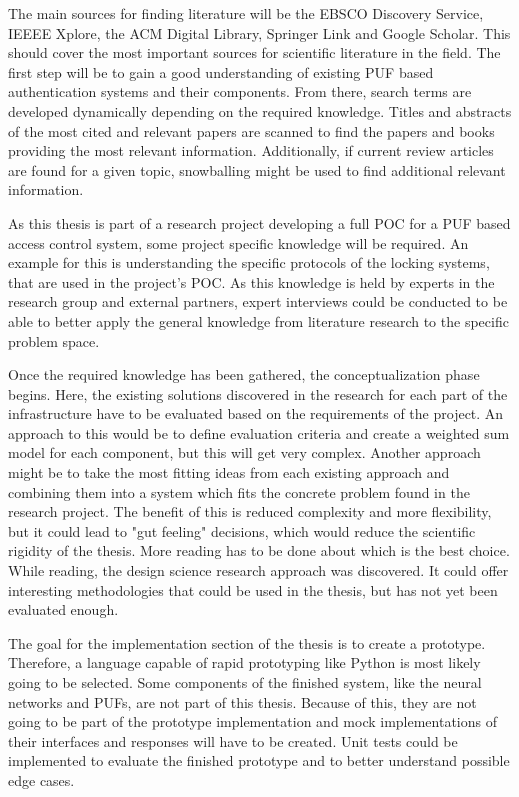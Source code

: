 The main sources for finding literature will be the EBSCO Discovery Service, IEEEE Xplore,
the ACM Digital Library, Springer Link and Google Scholar.
This should cover the most important sources for scientific literature in the field.
The first step will be to gain a good understanding of existing \ac{PUF} based authentication
systems and their components.
From there, search terms are developed dynamically depending on the required knowledge.
Titles and abstracts of the most cited and relevant papers are scanned to find the papers
and books providing the most relevant information.
Additionally, if current review articles are found for a given topic,
snowballing might be used to find additional relevant information.

As this thesis is part of a research project developing a full \ac{POC} for a \ac{PUF} based
access control system, some project specific knowledge will be required.
An example for this is understanding the specific protocols of the locking systems, that are used
in the project's \ac{POC}.
As this knowledge is held by experts in the research group and external partners,
expert interviews could be conducted to be able to better apply the general knowledge from
literature research to the specific problem space. 

Once the required knowledge has been gathered, the conceptualization phase begins.
Here, the existing solutions discovered in the research for each part of
the infrastructure have to be evaluated based on the requirements of the project.
An approach to this would be to define evaluation criteria and create a weighted sum model
for each component, but this will get very complex.
Another approach might be to take the most fitting ideas from each existing approach and
combining them into a system which fits the concrete problem found in the research project.
The benefit of this is reduced complexity and more flexibility, but it could lead to
"gut feeling" decisions, which would reduce the scientific rigidity of the thesis. More reading has to be done
about which is the best choice.
While reading, the design science research approach was discovered. \cite{Peffers2007}
It could offer interesting methodologies that could be used in the thesis, but has not yet been
evaluated enough.

The goal for the implementation section of the thesis is to create a prototype.
Therefore, a language capable of rapid prototyping like Python is most likely going
to be selected. Some components of the finished system, like the neural networks and \acp{PUF},
are not part of this thesis. Because of this, they are not going to be part of the prototype implementation and
mock implementations of their interfaces and responses will have to be created.
Unit tests could be implemented to evaluate the finished prototype and to better understand
possible edge cases.

